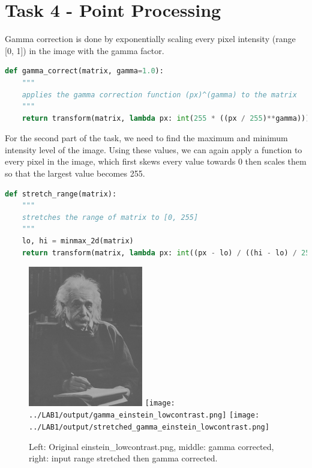 \clearpage
\section*{Task 4 - Point Processing}

Gamma correction is done by exponentially scaling every pixel intensity (range [0, 1]) in the image with the gamma factor.
\begin{lstlisting}[language=Python, label=gamma_correction, caption=Gamma correction]
def gamma_correct(matrix, gamma=1.0):
    """
    applies the gamma correction function (px)^(gamma) to the matrix
    """
    return transform(matrix, lambda px: int(255 * ((px / 255)**gamma)))
\end{lstlisting}

For the second part of the task, we need to find the maximum and minimum intensity level of the image.
Using these values, we can again apply a function to every pixel in the image,
which first skews every value towards 0 then scales them so that the largest value becomes 255.

\begin{lstlisting}[language=Python, label=input_range, caption=Input range stretching]
def stretch_range(matrix):
    """
    stretches the range of matrix to [0, 255]
    """
    lo, hi = minmax_2d(matrix)
    return transform(matrix, lambda px: int((px - lo) / ((hi - lo) / 255)))
\end{lstlisting}

\begin{figure}[h!]
    \centering
    \includegraphics[width=5cm]{../LAB1/img/einstein_lowcontrast.png}
    \texttt{[image: ../LAB1/output/gamma\_einstein\_lowcontrast.png]}
    \texttt{[image: ../LAB1/output/stretched\_gamma\_einstein\_lowcontrast.png]}
    \caption{Left: Original einstein\_lowcontrast.png, middle: gamma corrected, right: input range stretched then gamma corrected.}
\end{figure}



